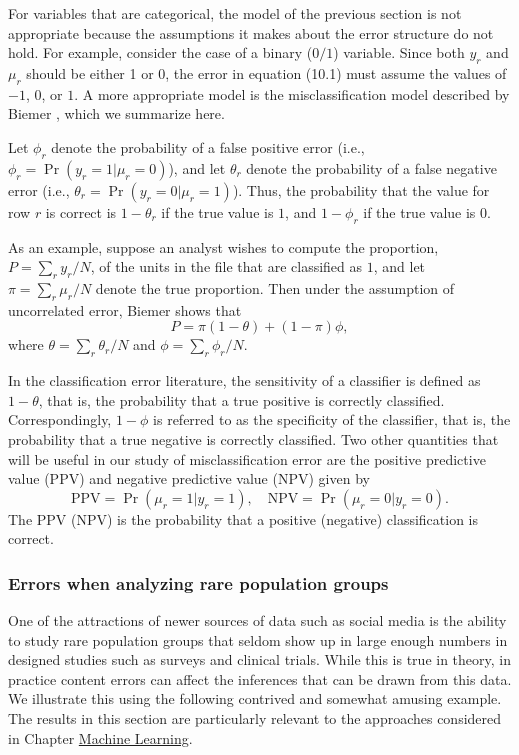 \documentclass[]{krantz}
\begin{document}
For variables that are categorical, the model of the previous section is
not appropriate because the assumptions it makes about the error
structure do not hold. For example, consider the case of a binary
(\(0/1\)) variable. Since both \(y_r\) and \(\mu_r\) should be either 1
or 0, the error in equation (10.1) must assume the values of \(-1\),
\(0\), or \(1\). A more appropriate model is the misclassification model
described by Biemer \citeyearpar{biemer2011latent}, which we summarize
here.

Let \(\phi_r\) denote the probability of a false positive error (i.e.,
\(\phi_r = \Pr (y_r = 1\vert \mu_r = 0)\)), and let \(\theta_r\) denote
the probability of a false negative error (i.e.,
\(\theta_r =\Pr (y_r = 0\vert \mu_r = 1)\)). Thus, the probability that
the value for row \(r\) is correct is \(1 - \theta_r\) if the true value
is \(1\), and \(1 - \phi_r\) if the true value is \(0\).

As an example, suppose an analyst wishes to compute the proportion,
\(P = \sum_r {y_r / N}\), of the units in the file that are classified
as \(1\), and let \(\pi = \sum_r {\mu_r / N}\) denote the true
proportion. Then under the assumption of uncorrelated error, Biemer
\citeyearpar{biemer2011latent} shows that \[\label{eq:10-1.3}
P = \pi (1 - \theta ) + (1 - \pi )\phi,\] where
\(\theta = \sum_r {\theta_r / N}\) and \(\phi = \sum_r {\phi_r / N}\).

In the classification error literature, the sensitivity of a classifier
is defined as \(1 - \theta\), that is, the probability that a true
positive is correctly classified. Correspondingly, \(1 - \phi\) is
referred to as the specificity of the classifier, that is, the
probability that a true negative is correctly classified. Two other
quantities that will be useful in our study of misclassification error
are the positive predictive value (PPV) and negative predictive value
(NPV) given by \[\label{eq:10-1.4}
\mathrm{PPV} = \Pr (\mu_r = 1\vert y_r = 1),\quad\mathrm{NPV} = \Pr
(\mu_r = 0\vert y_r = 0).\] The PPV (NPV) is the probability that a
positive (negative) classification is correct.

\subsubsection{Errors when analyzing rare population
groups}\label{sec:10-4.2.3}

One of the attractions of newer sources of data such as social media is
the ability to study rare population groups that seldom show up in large
enough numbers in designed studies such as surveys and clinical trials.
While this is true in theory, in practice content errors can affect the
inferences that can be drawn from this data. We illustrate this using
the following contrived and somewhat amusing example. The results in
this section are particularly relevant to the approaches considered in
Chapter \protect\hyperlink{chap:ml}{Machine Learning}.
\end{document}

